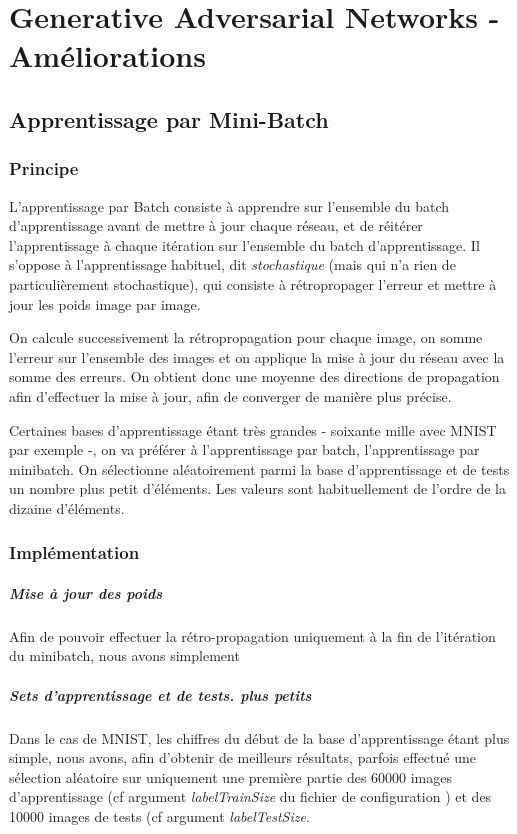 \chapter{Generative Adversarial Networks - Améliorations}


\section{Apprentissage par Mini-Batch}
\subsection{Principe}
L'apprentissage par Batch consiste à apprendre sur l'ensemble du batch d'apprentissage avant de mettre à jour chaque réseau, et de réitérer l'apprentissage à chaque itération sur l'ensemble du batch d'apprentissage. Il s'oppose à l'apprentissage habituel, dit \textit{stochastique} (mais qui n'a rien de particulièrement stochastique), qui consiste à rétropropager l'erreur et mettre à jour les poids image par image.

On calcule successivement la rétropropagation pour chaque image, on somme l'erreur sur l'ensemble des images et on applique la mise à jour du réseau avec la somme des erreurs. On obtient donc une moyenne des directions de propagation afin d'effectuer la mise à jour, afin de converger de manière plus précise.

Certaines bases d'apprentissage étant très grandes - soixante mille avec MNIST par exemple -, on va préférer à l'apprentissage par batch, l'apprentissage par minibatch. 
On sélectionne aléatoirement parmi la base d'apprentissage et de tests un nombre plus petit d'éléments. Les valeurs sont habituellement de l'ordre de la dizaine d'éléments.
\subsection{Implémentation}
\paragraph{Mise à jour des poids}
Afin de pouvoir effectuer la rétro-propagation uniquement à la fin de l'itération du minibatch, nous avons simplement 

\paragraph{Sets d'apprentissage et de tests. plus petits}
Dans le cas de MNIST, les chiffres du début de la base d'apprentissage étant plus simple, nous avons, afin d'obtenir de meilleurs résultats, parfois effectué une sélection aléatoire sur uniquement une première partie des 60000 images d'apprentissage (cf argument \textit{labelTrainSize} du fichier de configuration \cite{barrios_gan_2018}) et des 10000 images de tests (cf argument \textit{labelTestSize}.


